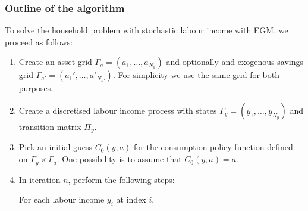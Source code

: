 \documentclass{scrartcl}
\begin{document}
    \hypertarget{outline-of-the-algorithm}{%
\subsubsection*{Outline of the algorithm}\label{outline-of-the-algorithm}}

To solve the household problem with stochastic labour income with EGM,
we proceed as follows:

\begin{enumerate}
\def\labelenumi{\arabic{enumi}.}
\item
  Create an asset grid \(\Gamma_a = (a_1, \dots, a_{N_a})\) and
  optionally and exogenous savings grid
  \(\Gamma_{a'} = (a_1', \dots, a'_{N_{a'}})\). For simplicity we use
  the same grid for both purposes.
\item
  Create a discretised labour income process with states
  \(\Gamma_y = (y_1, \dots, y_{N_y})\) and transition matrix \(\Pi_y\).
\item
  Pick an initial guess \(C_0(y,a)\) for the consumption policy function
  defined on \(\Gamma_y \times \Gamma_a\). One possibility is to assume
  that \(C_0(y,a) = a\).
\item
  In iteration \(n\), perform the following steps:

  For each labour income \(y_i\) at index \(i\),


\end{enumerate}
\end{document}
